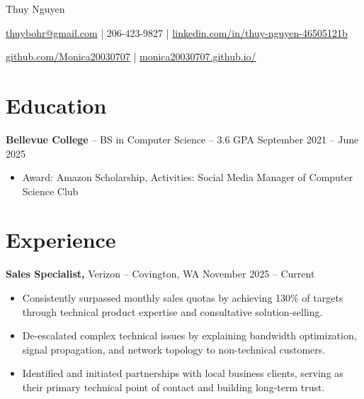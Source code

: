 \documentclass[11pt]{article}       %
\begin{document}
\centerline{\Huge Thuy Nguyen}

\vspace{5pt}

\centerline{\href{mailto:thuybohr@gmail.com}{thuybohr@gmail.com} | 206-423-9827 |
\href{https://www.linkedin.com/in/thuy-nguyen-46505121b/}{linkedin.com/in/thuy-nguyen-46505121b}}

\centerline{\href{https://github.com/Monica20030707}{github.com/Monica20030707} | 
\href{https://monica20030707.github.io/}{monica20030707.github.io/}} 

\vspace{-9pt}

\section*{Education}
\textbf{Bellevue College} -- BS in Computer Science -- 3.6 GPA \hfill September 2021 -- June 2025\\
\vspace{-9pt}
\begin{itemize}
  \item Award: Amazon Scholarship, Activities: Social Media Manager of Computer Science Club
\end{itemize}

\vspace{-18.5pt}

\section*{Experience}

\textbf{Sales Specialist,} {Verizon} -- Covington, WA \hfill November 2025 -- Current \\
\vspace{-9pt}
\begin{itemize}
  \item Consistently surpassed monthly sales quotas by achieving 130\% of targets through technical product expertise and consultative solution-selling.
  \item De-escalated complex technical issues by explaining bandwidth optimization, signal propagation, and network topology to non-technical customers.
  \item Identified and initiated partnerships with local business clients, serving as their primary technical point of contact and building long-term trust.
\end{itemize}
\end{document}
